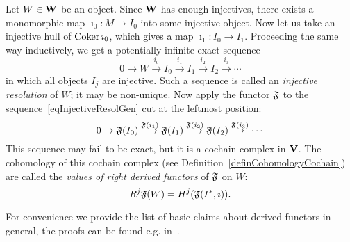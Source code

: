 \begin{con}\label{conDerivedFunctorGeneral}
Let $W\in\mathbf{W}$ be an object. Since $\mathbf{W}$ has enough injectives, there exists a monomorphic map $\imath_0\colon M\to I_0$ into some injective object. Now let us take an injective hull of $\operatorname{Coker} \imath_0$, which gives a map $\imath_1\colon I_0\to I_1$. Proceeding the same way inductively, we get a potentially infinite exact sequence
\begin{equation}\label{eqInjectiveResolGen}
0\to W\stackrel{i_0}{\to}I_0\stackrel{i_1}{\to}I_1\stackrel{i_2}{\to}I_2\stackrel{i_3}{\to}\cdots
\end{equation}
in which all objects $I_j$ are injective. Such a sequence is called an \emph{injective resolution} of $W$; it may be non-unique. Now apply the functor $\mathfrak{F}$ to the sequence~\eqref{eqInjectiveResolGen} cut at the leftmost position:
\begin{equation}\label{eqFuncOfInjective}
0\to\mathfrak{F}(I_0)\stackrel{\mathfrak{F}(i_1)}{\longrightarrow}\mathfrak{F}(I_1)\stackrel{\mathfrak{F}(i_2)}{\longrightarrow}\mathfrak{F}(I_2)\stackrel{\mathfrak{F}(i_3)}{\to}\cdots
\end{equation}
This sequence may fail to be exact, but it is a cochain complex in $\mathbf{V}$. The cohomology of this cochain complex (see Definition~\ref{definCohomologyCochain}) are called the \emph{values of right derived functors} of $\mathfrak{F}$ on $W$:
\[
R^j\mathfrak{F}(W)=H^j(\mathfrak{F}(I^*,\imath)).
\]
\end{con}

For convenience we provide the list of basic claims about derived functors in general, the proofs can be found e.g. in~\cite[\S 2.5]{weibel1994homalg}.

